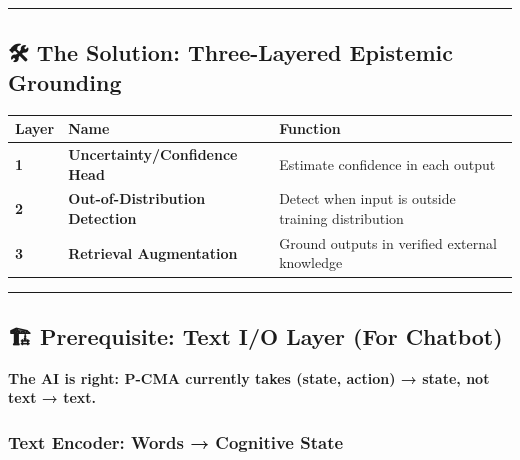 \documentclass[
  11pt,
  a4paper,
]{article}
\begin{document}
\begin{center}\rule{0.5\linewidth}{0.5pt}\end{center}

\subsection{🛠️ The Solution: Three-Layered Epistemic
Grounding}\label{the-solution-three-layered-epistemic-grounding}

\begin{longtable}[]{@{}
  >{\raggedright\arraybackslash}p{}
  >{\raggedright\arraybackslash}p{}
  >{\raggedright\arraybackslash}p{}@{}}
\toprule\noalign{}
\begin{minipage}[b]{\linewidth}\raggedright
Layer
\end{minipage} & \begin{minipage}[b]{\linewidth}\raggedright
Name
\end{minipage} & \begin{minipage}[b]{\linewidth}\raggedright
Function
\end{minipage} \\
\midrule\noalign{}
\endhead
\bottomrule\noalign{}
\endlastfoot
\textbf{1} & \textbf{Uncertainty/Confidence Head} & Estimate confidence
in each output \\
\textbf{2} & \textbf{Out-of-Distribution Detection} & Detect when input
is outside training distribution \\
\textbf{3} & \textbf{Retrieval Augmentation} & Ground outputs in
verified external knowledge \\
\end{longtable}

\begin{center}\rule{0.5\linewidth}{0.5pt}\end{center}

\subsection{🏗️ Prerequisite: Text I/O Layer (For
Chatbot)}\label{prerequisite-text-io-layer-for-chatbot}

\textbf{The AI is right: P-CMA currently takes (state, action) → state,
not text → text.}

\subsubsection{Text Encoder: Words → Cognitive
State}\label{text-encoder-words-cognitive-state}
\end{document}
